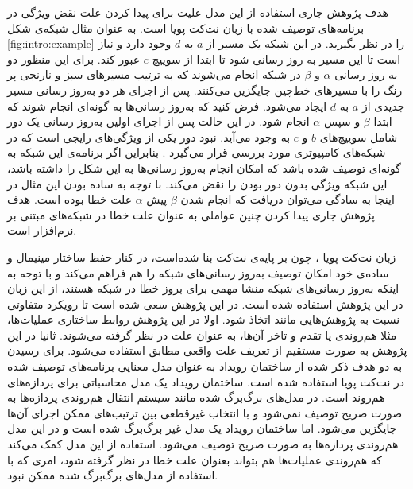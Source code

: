  هدف پژوهش جاری استفاده از این مدل علیت برای پیدا کردن علت نقض 
ویژگی در برنامه‌های توصیف شده با زبان نت‌کت پویا است.
به عنوان مثال شبکه‌ی شکل 
\ref{fig:intro:example}
را در نظر بگیرید.
در این شبکه یک مسیر از 
$a$
به 
$d$
وجود دارد و نیاز است تا این مسیر به روز رسانی شود تا ابتدا از سوییچ 
$c$
عبور کند. 
برای این منظور دو به روز رسانی 
$\alpha$
و
$\beta$
در شبکه انجام می‌شوند که به ترتیب مسیرهای سبز و نارنجی پر رنگ را با مسیر‌های خط‌چین جایگزین می‌کنند.
پس از اجرای هر دو به‌روز رسانی مسیر جدیدی از 
$a$
به 
$d$
ایجاد می‌شود.
فرض کنید که به‌روز رسانی‌ها به گونه‌ای انجام شوند که ابتدا 
$\beta$
و سپس
$\alpha$
انجام شود. 
در این حالت پس از اجرای اولین به‌روز رسانی یک دور%
شامل سوییچ‌های 
$b$
و 
$c$
به وجود می‌آید.
نبود دور یکی از ویژگی‌های رایجی است که در شبکه‌های کامپیوتری مورد بررسی قرار می‌گیرد
\cite{network-abstractions}.
بنابراین اگر برنامه‌ی این شبکه به گونه‌ای توصیف شده باشد که امکان انجام به‌روز رسانی‌ها به این شکل را داشته باشد، این شبکه ویژگی بدون دور بودن را نقض می‌کند.
با توجه به ساده بودن این مثال در اینجا به سادگی می‌توان دریافت که انجام شدن 
$\beta$
پیش 
$\alpha$
علت خطا بوده است.
هدف پژوهش جاری پیدا کردن چنین عواملی به عنوان علت خطا در شبکه‌های مبتنی بر نرم‌افزار است.

زبان نت‌کت پویا
، چون بر پایه‌ی نت‌کت بنا شده‌است،
در کنار حفظ ساختار مینیمال و ساده‌ی خود امکان توصیف به‌روز رسانی‌های شبکه‌ را هم فراهم می‌کند
و با توجه به اینکه به‌روز رسانی‌های شبکه منشا مهمی برای بروز خطا در شبکه هستند، از این زبان در این پژوهش استفاده شده است.
در این پژوهش سعی شده است تا رویکرد متفاوتی نسبت به پژوهش‌هایی مانند
\cite{causality-checking,causal-hml,decomposing}
اتخاذ شود.
اولا در این پژوهش روابط ساختاری عملیات‌ها،
مثلا هم‌روندی یا تقدم و تاخر آن‌ها، به عنوان علت در نظر گرفته می‌شوند.
ثانیا در این پژوهش به صورت مستقیم از تعریف علت واقعی مطابق
\cite{hp}
استفاده می‌شود.
برای رسیدن به دو هدف ذکر شده از ساختمان رویداد%
 \cite{es}
به عنوان مدل معنایی برنامه‌های توصیف شده در نت‌کت پویا استفاده شده است.
ساختمان رویداد یک مدل محاسباتی%
برای پردازه‌های هم‌روند است.
در مدل‌های برگ‌برگ شده%
مانند سیستم انتقال%
هم‌روندی پردازه‌ها به صورت صریح توصیف نمی‌شود و با انتخاب غیرقطعی%
بین ترتیب‌های ممکن اجرای آن‌ها جایگزین می‌شود.
اما ساختمان رویداد یک مدل غیر برگ‌برگ شده%
 است و در این مدل هم‌روندی پردازه‌ها به صورت صریح توصیف می‌شود.
استفاده از این مدل کمک می‌کند که هم‌روندی عملیات‌ها هم بتواند بعنوان علت خطا در نظر گرفته شود، امری که با استفاده از مدل‌های برگ‌برگ شده ممکن نبود. 

